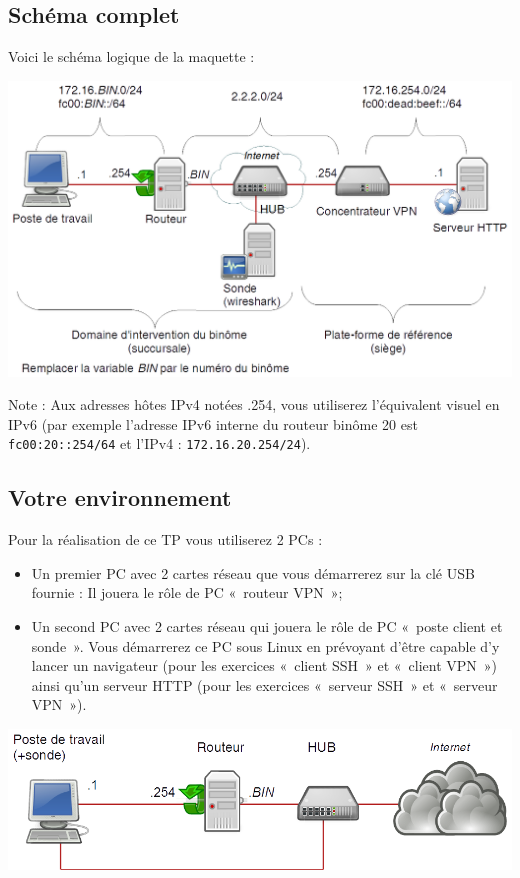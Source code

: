 \documentclass[a4paper,11pt]{article}
\newcommand{\shellcmd}[1]{\texttt{#1}}
\begin{document}
\subsection{Schéma complet}
Voici le schéma logique de la maquette :
\begin{center}
\includegraphics[width=0.9\linewidth]{schema-complet}
\end{center}

Note : Aux adresses hôtes IPv4 notées .254, vous utiliserez l'équivalent visuel en IPv6 (par exemple l'adresse IPv6 interne du routeur binôme 20 est \shellcmd{fc00:20::254/64} et l'IPv4 : \shellcmd{172.16.20.254/24}).

\subsection{Votre environnement}
Pour la réalisation de ce TP vous utiliserez 2 PCs :
\begin{itemize}
\item Un premier PC avec 2 cartes réseau que vous démarrerez sur la clé USB fournie : Il jouera le rôle de PC «~routeur VPN~»;
\item Un second PC avec 2 cartes réseau qui jouera le rôle de PC «~poste client et sonde~». Vous démarrerez ce PC sous Linux en prévoyant d'être capable d'y lancer un navigateur (pour les exercices «~client SSH~» et «~client VPN~») ainsi qu'un serveur HTTP (pour les exercices «~serveur SSH~» et «~serveur VPN~»).
\end{itemize}
\begin{center}
\includegraphics[width=0.8\linewidth]{environnement}
\end{center}
\end{document}

